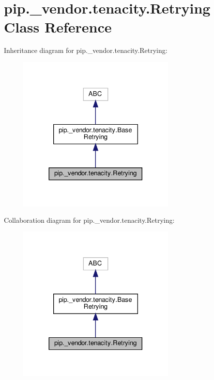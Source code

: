 \hypertarget{classpip_1_1__vendor_1_1tenacity_1_1Retrying}{}\section{pip.\+\_\+vendor.\+tenacity.\+Retrying Class Reference}
\label{classpip_1_1__vendor_1_1tenacity_1_1Retrying}


Inheritance diagram for pip.\+\_\+vendor.\+tenacity.\+Retrying\+:
\nopagebreak
\begin{figure}[H]
\begin{center}
\leavevmode
\includegraphics[width=224pt]{classpip_1_1__vendor_1_1tenacity_1_1Retrying__inherit__graph}
\end{center}
\end{figure}


Collaboration diagram for pip.\+\_\+vendor.\+tenacity.\+Retrying\+:
\nopagebreak
\begin{figure}[H]
\begin{center}
\leavevmode
\includegraphics[width=224pt]{classpip_1_1__vendor_1_1tenacity_1_1Retrying__coll__graph}
\end{center}
\end{figure}
